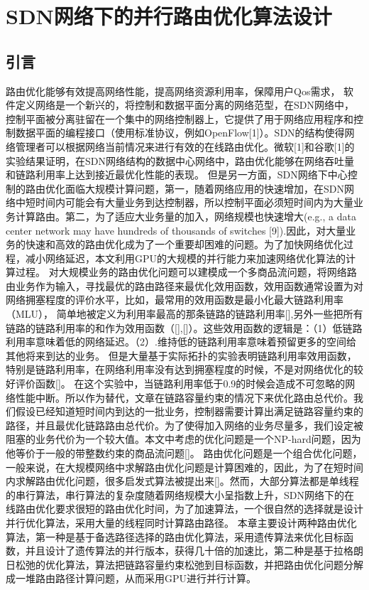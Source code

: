 
\chapter{SDN网络下的并行路由优化算法设计}
\section{引言}
路由优化能够有效提高网络性能，提高网络资源利用率，保障用户Qos需求，
软件定义网络是一个新兴的，将控制和数据平面分离的网络范型，在SDN网络中，控制平面被分离驻留在一个集中的网络控制器上，它提供了用于网络应用程序和控制数据平面的编程接口（使用标准协议，例如OpenFlow[1]）。SDN的结构使得网络管理者可以根据网络当前情况来进行有效的在线路由优化。微软[1]和谷歌[1]的实验结果证明，在SDN网络结构的数据中心网络中，路由优化能够在网络吞吐量和链路利用率上达到接近最优化性能的表现。
但是另一方面，SDN网络下中心控制的路由优化面临大规模计算问题，第一，随着网络应用的快速增加，在SDN网络中短时间内可能会有大量业务到达控制器，所以控制平面必须短时间内为大量业务计算路由。第二，为了适应大业务量的加入，网络规模也快速增大(e.g., a data center network may have hundreds of thousands of switches [9]).因此，对大量业务的快速和高效的路由优化成为了一个重要却困难的问题。为了加快网络优化过程，减小网络延迟，本文利用GPU的大规模的并行能力来加速网络优化算法的计算过程。
对大规模业务的路由优化问题可以建模成一个多商品流问题，将网络路由业务作为输入，寻找最优的路由路径来最优化效用函数，效用函数通常设置为对网络拥塞程度的评价水平，比如，最常用的效用函数是最小化最大链路利用率（MLU），
简单地被定义为利用率最高的那条链路的链路利用率[],另外一些把所有链路的链路利用率的和作为效用函数（[],[]）。这些效用函数的逻辑是：（1）低链路利用率意味着低的网络延迟。（2）.维持低的链路利用率意味着预留更多的空间给其他将来到达的业务。
但是大量基于实际拓扑的实验表明链路利用率效用函数，特别是链路利用率，在网络利用率没有达到拥塞程度的时候，不是对网络优化的较好评价函数[]。
在这个实验中，当链路利用率低于0.9的时候会造成不可忽略的网络性能中断。所以作为替代，文章在链路容量约束的情况下来优化路由总代价。我们假设已经知道短时间内到达的一批业务，控制器需要计算出满足链路容量约束的路径，并且最优化链路路由总代价。为了使得加入网络的业务尽量多，我们设定被阻塞的业务代价为一个较大值。本文中考虑的优化问题是一个NP-hard问题，因为他等价于一般的带整数约束的商品流问题[]。
路由优化问题是一个组合优化问题，一般来说，在大规模网络中求解路由优化问题是计算困难的，因此，为了在短时间内求解路由优化问题，很多启发式算法被提出来[]。然而，大部分算法都是单线程的串行算法，串行算法的复杂度随着网络规模大小呈指数上升，SDN网络下的在线路由优化要求很短的路由优化时间，为了加速算法，一个很自然的选择就是设计并行优化算法，采用大量的线程同时计算路由路径。
本章主要设计两种路由优化算法，第一种是基于备选路径选择的路由优化算法，采用遗传算法来优化目标函数，并且设计了遗传算法的并行版本，获得几十倍的加速比，第二种是基于拉格朗日松弛的优化算法，算法把链路容量约束松弛到目标函数，并把路由优化问题分解成一堆路由路径计算问题，从而采用GPU进行并行计算。

